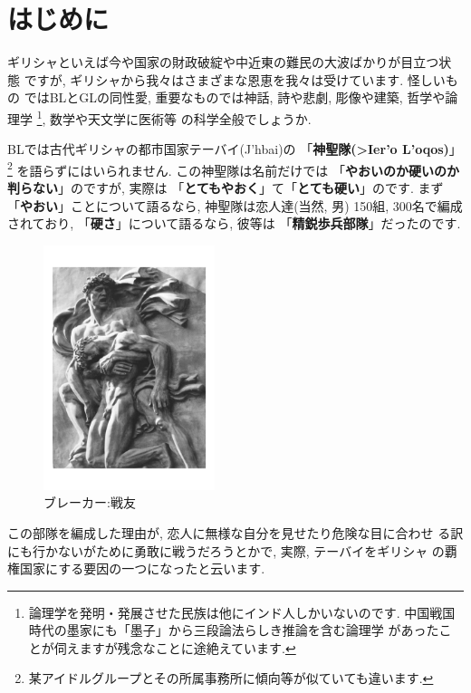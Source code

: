 \section{はじめに}

ギリシャといえば今や国家の財政破綻や中近東の難民の大波ばかりが目立つ状態
ですが, ギリシャから我々はさまざまな恩恵を我々は受けています. 怪しいもの
ではBLとGLの同性愛, 重要なものでは神話, 詩や悲劇, 彫像や建築, 哲学や論理学
\footnote{論理学を発明・発展させた民族は他にインド人しかいないのです.
 中国戦国時代の墨家にも「墨子」\cite{墨子}から三段論法らしき推論を含む論理学
があったことが伺えますが残念なことに途絶えています.}, 数学や天文学に医術等
の科学全般でしょうか.
\newline

BLでは古代ギリシャの都市国家テーバイ(\textgreek{J'hbai})の
「\textbf{神聖隊(\textgreek{>Ier'o L'oqos})}」
\footnote{某アイドルグループとその所属事務所に傾向等が似ていても違います.}
を語らずにはいられません. この神聖隊は名前だけでは
「\textbf{やおいのか硬いのか判らない}」のですが, 実際は
「\textbf{とてもやおく}」て「\textbf{とても硬い}」のです. まず
「\textbf{やおい}」ことについて語るなら, 神聖隊は恋人達(当然, 男)
150組, 300名で編成されており, 「\textbf{硬さ}」について語るなら, 彼等は
「\textbf{精鋭歩兵部隊}」だったのです.
\newline
 
 
\begin{figure}
\includegraphics[width=5cm]{arno_breker_kameradschaft.pdf}
\caption{ブレーカー:戦友}
\label{fig:breker2}
\end{figure}

この部隊を編成した理由が, 恋人に無様な自分を見せたり危険な目に合わせ
る訳にも行かないがために勇敢に戦うだろうとかで, 実際, テーバイをギリシャ
の覇権国家にする要因の一つになったと云います.
\newline

